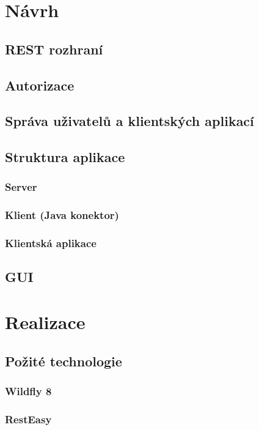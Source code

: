 \documentclass[thesis=M,czech]{FITthesis}[2014/05/6]
\begin{document}
\chapter{Návrh}

\section{REST rozhraní}

\section{Autorizace}

\section{Správa uživatelů a klientských aplikací}

\section{Struktura aplikace}
\subsection{Server}
\subsection{Klient (Java konektor)}
\subsection{Klientská aplikace}

\section{GUI}

\chapter{Realizace}

\section{Požité technologie}
\subsection{Wildfly 8}
\subsection{RestEasy}
\end{document}

